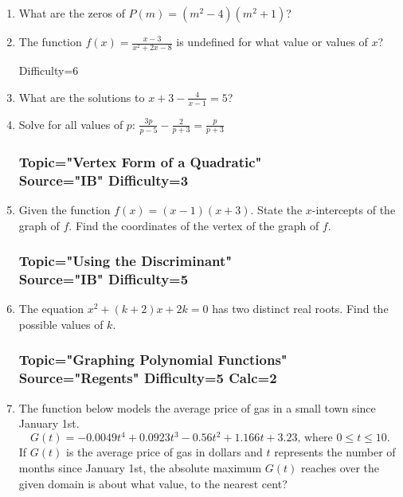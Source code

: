 \documentclass[12pt, oneside]{article}
\begin{document}
\begin{enumerate}
\item What are the zeros of $P(m) = (m^2 - 4)(m^2+ 1)$? %

\item The function $\displaystyle f(x)=\frac{x-3}{x^2+2x-8}$ is undefined for what value or values of $x$? %

Difficulty=6
\item What are the solutions to $\displaystyle x+3- \frac{4}{x-1} =5$? %

\item Solve for all values of $p$: $\displaystyle \frac{3p}{p-5} - \frac{2}{p+3} =\frac{p}{p+3}$ %

\subsubsection*{Topic="Vertex Form of a Quadratic"\\
Source="IB" 
Difficulty=3}

\item Given the function $f(x)=(x-1)(x+3)$. State the $x$-intercepts of the graph of $f$. Find the coordinates of the vertex of the graph of $f$.


\subsubsection*{Topic="Using the Discriminant"\\
Source="IB" 
Difficulty=5}

\item The equation $x^2+(k+2)x+2k=0$ has two distinct real roots. Find the possible values of $k$.

\subsubsection*{Topic="Graphing Polynomial Functions"\\
Source="Regents" 
Difficulty=5 Calc=2}

\item The function below models the average price of gas in a small town since January 1st.
\[G(t)=-0.0049t^4 + 0.0923t^3 - 0.56t^2 +1.166t+3.23 \text{, where } 0 \leq t \leq 10.\]
If $G(t)$ is the average price of gas in dollars and $t$ represents the number of months since January 1st, the absolute maximum $G(t)$ reaches over the given domain is about what value, to the nearest cent? %


\end{enumerate}
\end{document}
